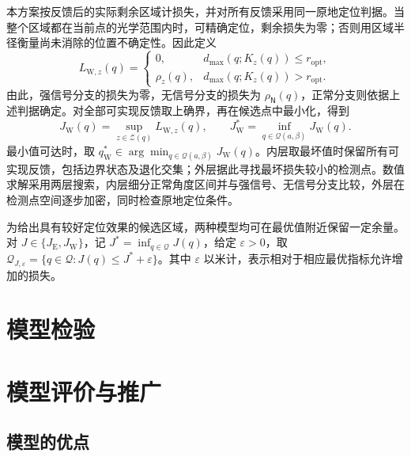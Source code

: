 \documentclass[UTF8,a4paper,zihao=-4,fontset=none]{ctexart}
\begin{document}
本方案按反馈后的实际剩余区域计损失，并对所有反馈采用同一原地定位判据。当整个区域都在当前点的光学范围内时，可精确定位，剩余损失为零；否则用区域半径衡量尚未消除的位置不确定性。因此定义
\begin{equation}
 L_{\mathrm W,z}(q)=
 \begin{cases}
 0,&d_{\max}(q;K_z(q))\le r_{\mathrm{opt}},\\
 \rho_z(q),&d_{\max}(q;K_z(q))>r_{\mathrm{opt}}.
 \end{cases}
\label{eq:q2-pair-worst-loss}
\end{equation}
由此，强信号分支的损失为零，无信号分支的损失为 \(\rho_{\mathsf N}(q)\)，正常分支则依据上述判据确定。对全部可实现反馈取上确界，再在候选点中最小化，得到
\begin{equation}
 J_{\mathrm W}(q)=\sup_{z\in\mathcal Z(q)}L_{\mathrm W,z}(q),
 \qquad J_{\mathrm W}^*=\inf_{q\in\mathcal Q(a,\beta)}J_{\mathrm W}(q).
\label{eq:q2-pair-worst-objective}
\end{equation}
最小值可达时，取 \(q_{\mathrm W}^*\in\arg\min_{q\in\mathcal Q(a,\beta)}J_{\mathrm W}(q)\)。内层取最坏值时保留所有可实现反馈，包括边界状态及退化交集；外层据此寻找最坏损失较小的检测点。数值求解采用两层搜索，内层细分正常角度区间并与强信号、无信号分支比较，外层在检测点空间逐步加密，同时检查原地定位条件。

为给出具有较好定位效果的候选区域，两种模型均可在最优值附近保留一定余量。对 \(J\in\{J_{\mathrm E},J_{\mathrm W}\}\)，记 \(J^*=\inf_{q\in\mathcal Q}J(q)\)，给定 \(\varepsilon>0\)，取 \(\mathcal Q_{J,\varepsilon}=\{q\in\mathcal Q:J(q)\le J^*+\varepsilon\}\)。其中 \(\varepsilon\) 以米计，表示相对于相应最优指标允许增加的损失。




\section{模型检验}


\section{模型评价与推广}

\subsection{模型的优点}

\end{document}
